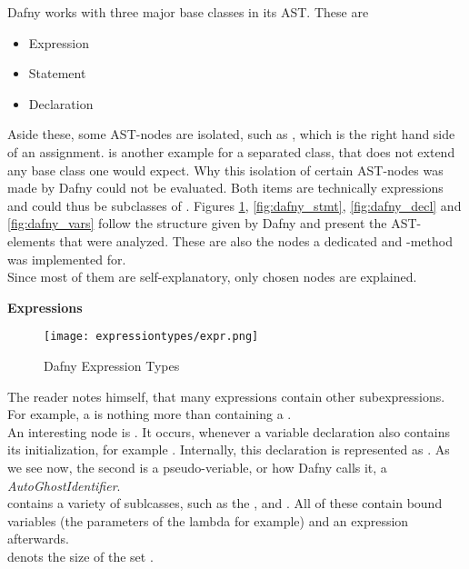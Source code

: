 Dafny works with three major base classes in its AST.
These are
\begin{itemize}
    \item Expression
    \item Statement
    \item Declaration
\end{itemize}
Aside these, some AST-nodes are isolated, such as , which is the right hand side of an assignment.
 is another example for a separated class, that does not extend any base class one would expect.
Why this isolation of certain AST-nodes was made by Dafny could not be evaluated.
Both items are technically expressions and could thus be subclasses of .
Figures \ref{fig:dafny_expr}, \ref{fig:dafny_stmt}, \ref{fig:dafny_decl} and \ref{fig:dafny_vars} follow the structure given by Dafny and present the AST-elements that were analyzed.
These are also the nodes a dedicated  and -method was implemented for.\\

Since most of them are self-explanatory, only chosen nodes are explained.

\pagebreak

\textbf{Expressions}\\
\begin{figure}[H]
    \centering
    \texttt{[image: expressiontypes/expr.png]}
    \caption{Dafny Expression Types}
    \label{fig:dafny_expr}
\end{figure}

The reader notes himself, that many expressions contain other subexpressions.
For example, a  is nothing more than containing a .\\

An interesting node is .
It occurs, whenever a variable declaration also contains its initialization, for example .
Internally, this declaration is represented as .
As we see now, the second  is a pseudo-veriable, or how Dafny calls it, a \textit{AutoGhostIdentifier}.\\

 contains a variety of sublcasses, such as the ,  and .
All of these contain bound variables (the parameters of the lambda for example) and an expression afterwards.\\
 denots the size of the set .\\

